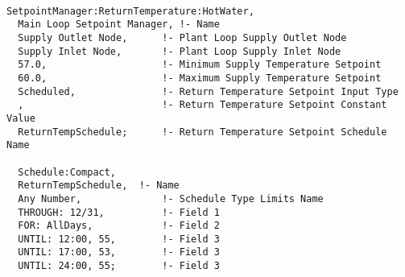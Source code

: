 \begin{lstlisting}

SetpointManager:ReturnTemperature:HotWater,
  Main Loop Setpoint Manager, !- Name
  Supply Outlet Node,      !- Plant Loop Supply Outlet Node
  Supply Inlet Node,       !- Plant Loop Supply Inlet Node
  57.0,                    !- Minimum Supply Temperature Setpoint
  60.0,                    !- Maximum Supply Temperature Setpoint
  Scheduled,               !- Return Temperature Setpoint Input Type
  ,                        !- Return Temperature Setpoint Constant Value
  ReturnTempSchedule;      !- Return Temperature Setpoint Schedule Name

  Schedule:Compact,
  ReturnTempSchedule,  !- Name
  Any Number,              !- Schedule Type Limits Name
  THROUGH: 12/31,          !- Field 1
  FOR: AllDays,            !- Field 2
  UNTIL: 12:00, 55,        !- Field 3
  UNTIL: 17:00, 53,        !- Field 3
  UNTIL: 24:00, 55;        !- Field 3
\end{lstlisting}
